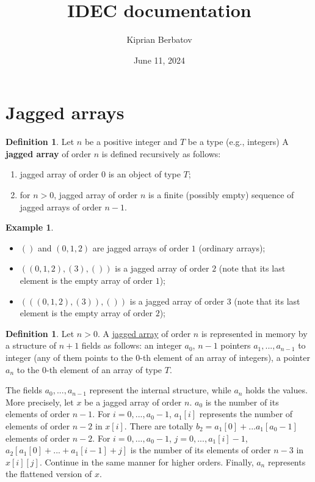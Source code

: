 \documentclass[fleqn]{article}
\title{IDEC documentation}
\author{Kiprian Berbatov}
\date{June 11, 2024}
\theoremstyle{definition}
\newtheorem{definition}[theorem]{Definition}
\newtheorem{example}[theorem]{Example}
\begin{document}
\maketitle

\section{Jagged arrays}

\begin{definition}
  \label{idec:jagged:definition}
  Let $n$ be a positive integer and $T$ be a type (e.g., integers)
  A \textbf{jagged array}
  of order $n$ is defined recursively as follows:
  \begin{enumerate}
    \item
      jagged array of order $0$ is an object of type $T$;
    \item
      for $n > 0$, jagged array of order $n$ is a finite (possibly empty)
      sequence of jagged arrays of order $n - 1$.
  \end{enumerate}
\end{definition}

\begin{example}
  \leavevmode
  \begin{itemize}
    \item
      $()$ and $(0, 1, 2)$ are jagged arrays of order $1$ (ordinary arrays);
    \item
      $((0, 1, 2), (3), ())$ is a jagged array of order $2$
      (note that its last element is the empty array of order $1$);
    \item
      $(((0, 1, 2), (3)),())$ is a jagged array of order $3$
      (note that its last element is the empty array of order $2$);
  \end{itemize}
\end{example}

\begin{definition}
  Let $n > 0$.
  A \hyperref[idec:jagged:definition]{jagged array}
  of order $n$ is represented in memory by a structure of $n + 1$
  fields as follows:
  an integer $a_0$,
  $n - 1$ pointers $a_1, ..., a_{n - 1}$ to integer
  (any of them points to the  $0$-th element of an array of integers),
  a pointer $a_n$ to the $0$-th element of an array of type $T$.
  
  The fields $a_0, ..., a_{n - 1}$ represent the internal structure,
  while $a_n$ holds the values.
  More precisely, let $x$ be a jagged array of order $n$.
  $a_0$ is the number of its elements of order $n - 1$.
  For $i = 0, ..., a_0 - 1$,
  $a_1[i]$ represents the number of elements of order $n - 2$ in $x[i]$.
  There are totally $b_2 = a_1[0] + ... a_1[a_0 - 1]$ elements of order $n - 2$.
  For $i = 0, ..., a_0 - 1$, $j  = 0, ..., a_1[i] - 1$,
  $a_2[a_1[0] + ... + a_1[i - 1] + j]$
  is the number of its elements of order $n - 3$ in $x[i][j]$.
  Continue in the same manner for higher orders.
  Finally, $a_n$ represents the flattened version of $x$.
\end{definition}
\end{document}

